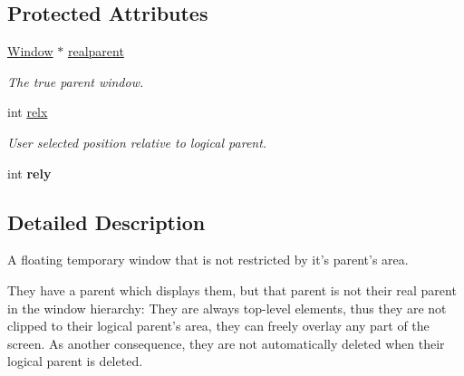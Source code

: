 \subsection*{Protected Attributes}
\begin{DoxyCompactItemize}
\item 
\hypertarget{classGUI_1_1TransientWindow_a60cf2fbbe9a995a518426c436ae671d7}{\hyperlink{classGUI_1_1Window}{Window} $\ast$ \hyperlink{classGUI_1_1TransientWindow_a60cf2fbbe9a995a518426c436ae671d7}{realparent}}\label{classGUI_1_1TransientWindow_a60cf2fbbe9a995a518426c436ae671d7}

\begin{DoxyCompactList}\small\item\em The true parent window. \end{DoxyCompactList}\item 
\hypertarget{classGUI_1_1TransientWindow_ad4dd88c6ac5e34b4bc0032cd685fe1bf}{int \hyperlink{classGUI_1_1TransientWindow_ad4dd88c6ac5e34b4bc0032cd685fe1bf}{relx}}\label{classGUI_1_1TransientWindow_ad4dd88c6ac5e34b4bc0032cd685fe1bf}

\begin{DoxyCompactList}\small\item\em User selected position relative to logical parent. \end{DoxyCompactList}\item 
\hypertarget{classGUI_1_1TransientWindow_ae74be94cedae9e1277010b45f4f6248a}{int {\bfseries rely}}\label{classGUI_1_1TransientWindow_ae74be94cedae9e1277010b45f4f6248a}

\end{DoxyCompactItemize}


\subsection{Detailed Description}
A floating temporary window that is not restricted by it's parent's area. 

They have a parent which displays them, but that parent is not their real parent in the window hierarchy\-: They are always top-\/level elements, thus they are not clipped to their logical parent's area, they can freely overlay any part of the screen. As another consequence, they are not automatically deleted when their logical parent is deleted.

